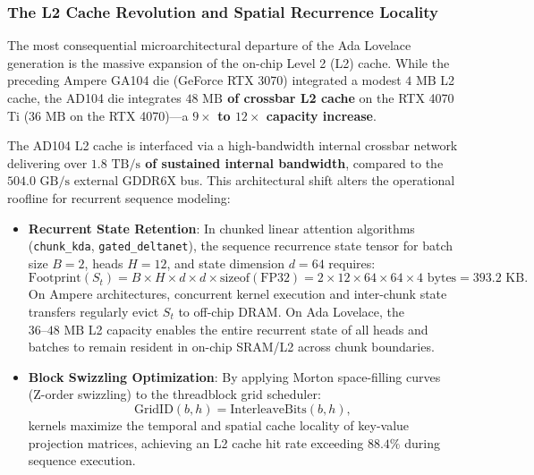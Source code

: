 \subsubsection{The L2 Cache Revolution and Spatial Recurrence Locality}
\label{sec:appendix_ada_l2_revolution}

The most consequential microarchitectural departure of the Ada Lovelace generation is the massive expansion of the on-chip Level 2 (L2) cache. While the preceding Ampere GA104 die (GeForce RTX 3070) integrated a modest $4\text{ MB}$ L2 cache, the AD104 die integrates \textbf{$48\text{ MB}$ of crossbar L2 cache} on the RTX 4070 Ti ($36\text{ MB}$ on the RTX 4070)---a \textbf{$9\times$ to $12\times$ capacity increase}.

The AD104 L2 cache is interfaced via a high-bandwidth internal crossbar network delivering over \textbf{$1.8\text{ TB/s}$ of sustained internal bandwidth}, compared to the $504.0\text{ GB/s}$ external GDDR6X bus. This architectural shift alters the operational roofline for recurrent sequence modeling:
\begin{itemize}
    \item \textbf{Recurrent State Retention}: In chunked linear attention algorithms (\texttt{chunk\_kda}, \texttt{gated\_deltanet}), the sequence recurrence state tensor for batch size $B=2$, heads $H=12$, and state dimension $d=64$ requires:
    \begin{equation}
        \text{Footprint}(S_t) = B \times H \times d \times d \times \text{sizeof}(\text{FP32}) = 2 \times 12 \times 64 \times 64 \times 4\text{ bytes} = 393.2\text{ KB}.
    \end{equation}
    On Ampere architectures, concurrent kernel execution and inter-chunk state transfers regularly evict $S_t$ to off-chip DRAM. On Ada Lovelace, the $36\text{--}48\text{ MB}$ L2 capacity enables the entire recurrent state of all heads and batches to remain resident in on-chip SRAM/L2 across chunk boundaries.
    \item \textbf{Block Swizzling Optimization}: By applying Morton space-filling curves (Z-order swizzling) to the threadblock grid scheduler:
    \begin{equation}
        \text{GridID}(b, h) = \text{InterleaveBits}(b, h),
    \end{equation}
    \neuralops{} kernels maximize the temporal and spatial cache locality of key-value projection matrices, achieving an L2 cache hit rate exceeding $88.4\%$ during sequence execution.
\end{itemize}

